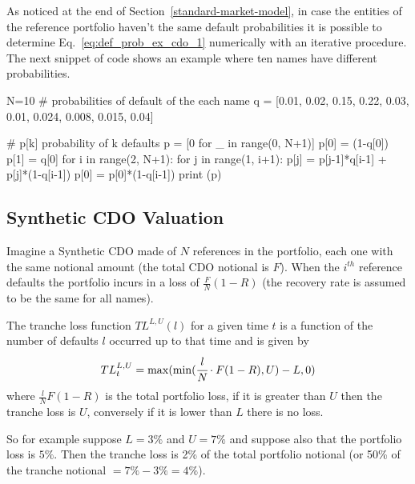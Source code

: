 \begin{attention}
As noticed at the end of Section~\ref{standard-market-model}, in case the entities of the reference portfolio haven't the same default probabilities it is possible to determine Eq.~\ref{eq:def_prob_ex_cdo_1} numerically with an iterative procedure. The next snippet of code shows an example where ten names have different probabilities.

\begin{attpython}
N=10
# probabilities of default of the each name
q = [0.01, 0.02, 0.15, 0.22, 0.03, 0.01, 0.024, 0.008, 0.015, 0.04]

# p[k] probability of k defaults
p = [0 for _ in range(0, N+1)]
p[0] = (1-q[0])
p[1] = q[0]
for i in range(2, N+1):
    for j in range(1, i+1):
        p[j] = p[j-1]*q[i-1] + p[j]*(1-q[i-1])
    p[0] = p[0]*(1-q[i-1])
print (p)
\end{attpython}
\begin{ioutput}
[0.5655235318063276, 0.350403844356834, 0.11955743831716371,
 0.0330669128164737, 0.007898678014359, 0.00081191731818153,
 5.350491409986e-05, 2.81423807427e-06, 1.2554827537575e-07,
 5.216612301099e-09, 2.08664492043e-10]
\end{ioutput}
\end{attention}

\subsection{Synthetic CDO Valuation}
Imagine a Synthetic CDO made of $N$ references in the portfolio, each one with the same notional amount (the total CDO notional is $F$).
When the $i^{th}$ reference defaults the portfolio incurs in a loss of $\frac{F}{N}(1-R)$ (the recovery rate is assumed to be the same for all names).

The tranche loss function $TL^{L,U}(l)$ for a given time $t$ is a function of the number of defaults $l$ occurred up to that time and is given by
\begin{equation}
TL_{t}^{L,U}=\mathrm{max}(\mathrm{min}(\cfrac{l}{N}\cdot F(1-R), U)-L, 0)
\end{equation}
where $\frac{l}{N}F(1-R)$ is the total portfolio loss, if it is greater than $U$ then the tranche loss is $U$, conversely if it is lower than $L$ there is no loss.

So for example suppose $L=3\%$ and $U=7\%$ and suppose also that the portfolio loss is $5\%$. Then the tranche loss is 2\% of the total portfolio notional (or 50\% of the tranche notional $=7\%-3\%=4\%$).

